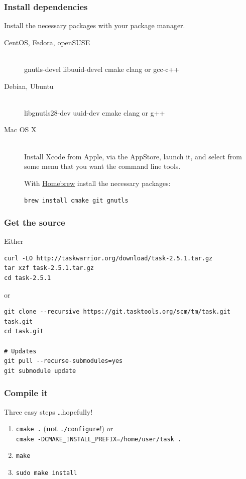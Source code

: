 \documentclass[t]{beamer}
\begin{document}
\begin{frame}[fragile]\frametitle{Install dependencies}
    Install the necessary packages with your package manager.

    \begin{description}
        \item[CentOS, Fedora, openSUSE] \hfill \\
            gnutls-devel libuuid-devel cmake clang or gcc-c++
        \item[Debian, Ubuntu] \hfill \\
            libgnutls28-dev uuid-dev cmake clang or g++
        \item[Mac OS X] \hfill \\
            Install Xcode from Apple, via the AppStore, launch it, and select from some menu that you want the command line tools.

            With \href{http://brew.sh/}{Homebrew} install the necessary packages:

            \verb=brew install cmake git gnutls=
    \end{description}

\end{frame}

\begin{frame}[fragile]\frametitle{Get the source}
    \vfill
    Either

    \begin{lstlisting}
curl -LO http://taskwarrior.org/download/task-2.5.1.tar.gz
tar xzf task-2.5.1.tar.gz
cd task-2.5.1\end{lstlisting} \pause

    or

    \begin{lstlisting}
git clone --recursive https://git.tasktools.org/scm/tm/task.git task.git
cd task.git

# Updates
git pull --recurse-submodules=yes
git submodule update\end{lstlisting}
\end{frame}

\begin{frame}[fragile]\frametitle{Compile it}
    \vfill
    Three easy steps \ldots hopefully! \pause
    \begin{enumerate}
        \item \verb=cmake .= (\textbf{not} \verb=./configure=!) or \\
              \verb+cmake -DCMAKE_INSTALL_PREFIX=/home/user/task .+ \pause
        \item \verb=make= \pause
        \item \verb=sudo make install=
    \end{enumerate}
\end{frame}
\end{document}
